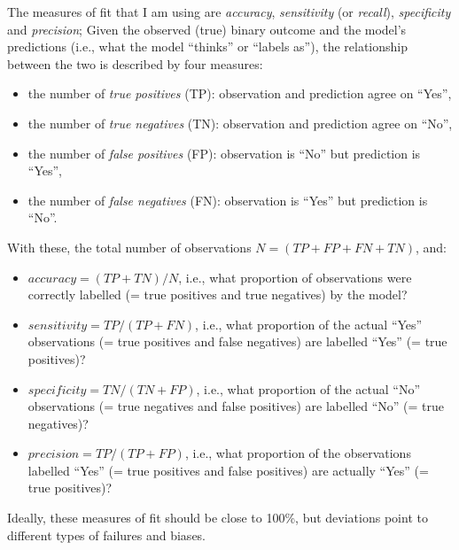 \documentclass[twoside,twocolumn]{article}
\begin{document}
The measures of fit that I am using are \emph{accuracy}, \emph{sensitivity} (or \emph{recall}), \emph{specificity} and \emph{precision}; Given the observed (true) binary outcome and the model's predictions (i.e., what the model ``thinks'' or ``labels as''), the relationship between the two is described by four measures:

\begin{itemize}
  \item the number of \emph{true positives} (TP): observation and prediction agree on ``Yes'',
  \item the number of \emph{true negatives} (TN): observation and prediction agree on ``No'',
  \item the number of \emph{false positives} (FP): observation is ``No'' but prediction is ``Yes'',
  \item the number of \emph{false negatives} (FN): observation is ``Yes'' but prediction is ``No''.
\end{itemize}

With these, the total number of observations $N = (TP+FP+FN+TN)$, and:

\begin{itemize}
  \item $accuracy = (TP+TN)/N$, i.e., what proportion of observations were correctly labelled (= true positives and true negatives) by the model?
  \item $sensitivity = TP/(TP+FN)$, i.e., what proportion of the actual ``Yes'' observations (= true positives and false negatives) are labelled ``Yes'' (= true positives)?
  \item $specificity = TN/(TN+FP)$, i.e., what proportion of the actual ``No'' observations (= true negatives and false positives) are labelled ``No'' (= true negatives)?
  \item $precision = TP/(TP+FP)$, i.e., what proportion of the observations labelled ``Yes'' (= true positives and false positives) are actually ``Yes'' (= true positives)?
\end{itemize}

Ideally, these measures of fit should be close to 100\%, but deviations point to different types of failures and biases.
\end{document}
